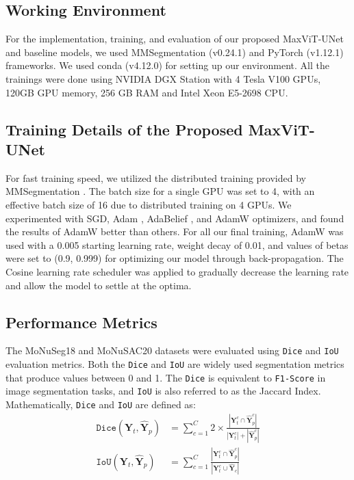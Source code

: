 \documentclass{article}
\begin{document}
\subsection{Working Environment}\label{Working Environment}

For the implementation, training, and evaluation of our proposed MaxViT-UNet and baseline models, we used MMSegmentation \cite{contributors2020openmmlab} (v0.24.1) and PyTorch \cite{pytorch} (v1.12.1) frameworks. We used conda (v4.12.0) for setting up our environment. All the trainings were done using NVIDIA DGX Station with 4 Tesla V100 GPUs, 120GB GPU memory, 256 GB RAM and Intel Xeon E5-2698 CPU.

\subsection{Training Details of the Proposed MaxViT-UNet}\label{Training Details of the Proposed MaxViT-UNet}

For fast training speed, we utilized the distributed training provided by MMSegmentation \cite{contributors2020openmmlab}. The batch size for a single GPU was set to 4, with an effective batch size of 16 due to distributed training on 4 GPUs. We experimented with SGD, Adam \cite{kingma2014adam}, AdaBelief \cite{zhuang2020adabelief}, and AdamW \cite{loshchilov2018decoupled} optimizers, and found the results of AdamW \cite{loshchilov2018decoupled} better than others. For all our final training, AdamW was used with a 0.005 starting learning rate, weight decay of 0.01, and values of betas were set to (0.9, 0.999) for optimizing our model through back-propagation. The Cosine learning rate scheduler was applied to gradually decrease the learning rate and allow the model to settle at the optima.

\subsection{Performance Metrics}\label{Performance Metrics}

The MoNuSeg18 and MoNuSAC20 datasets were evaluated using \texttt{Dice} and \texttt{IoU} evaluation metrics. Both the \texttt{Dice} and \texttt{IoU} are widely used segmentation metrics that produce values between 0 and 1. The \texttt{Dice} is equivalent to \texttt{F1-Score} in image segmentation tasks, and \texttt{IoU} is also referred to as the Jaccard Index. Mathematically, \texttt{Dice} and \texttt{IoU} are defined as:
\begin{align}
\texttt{Dice}(\textbf{Y}_{t}, \hat{\textbf{Y}}_{p}) &= \sum_{c=1}^{C} 2 \times \frac{|\textbf{Y}_{t}^{c} \cap \hat{\textbf{Y}}_{p}^{c}|}{|\textbf{Y}_{t}^{c}| + |\hat{\textbf{Y}}_{p}^{c}|} \\
\texttt{IoU}(\textbf{Y}_{t}, \hat{\textbf{Y}}_{p}) &= \sum_{c=1}^{C} \frac{|\textbf{Y}_{t}^{c} \cap \hat{\textbf{Y}}_{p}^{c}|}{|\textbf{Y}_{t}^{c} \cup \hat{\textbf{Y}}_c|}
\end{align}
\end{document}
